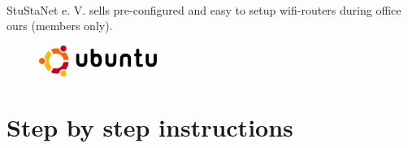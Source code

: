 \documentclass[a4paper,12pt]{scrartcl}
\begin{document}
\vspace{2em}
\
\\
StuStaNet e. V. sells pre-configured and easy to setup wifi-routers during office ours (members only).

\newpage

\begin{figure}[t!]
    \raggedleft
    \vspace{-20pt}
    \includegraphics[height=1cm,keepaspectratio]{Bilder/Ubuntu_logo}
    \vspace{-30pt}
\end{figure}

\section*{Step by step instructions}
\end{document}

